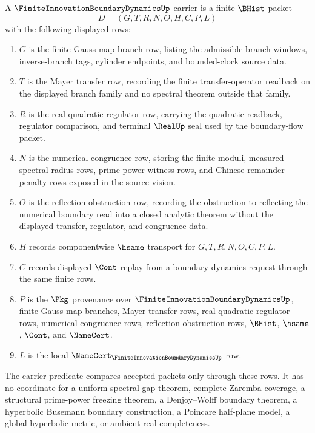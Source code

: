 \begin{definition}
\label{def:finite-innovation-boundary-dynamics-carrier}
A $\FiniteInnovationBoundaryDynamicsUp$ carrier is a finite $\BHist$ packet
$$
D=(G,T,R,N,O,H,C,P,L)
$$
with the following displayed rows:
\begin{enumerate}
\item $G$ is the finite Gauss-map branch row, listing the admissible branch windows, inverse-branch tags, cylinder endpoints, and bounded-clock source data.
\item $T$ is the Mayer transfer row, recording the finite transfer-operator readback on the displayed branch family and no spectral theorem outside that family.
\item $R$ is the real-quadratic regulator row, carrying the quadratic readback, regulator comparison, and terminal $\RealUp$ seal used by the boundary-flow packet.
\item $N$ is the numerical congruence row, storing the finite moduli, measured spectral-radius rows, prime-power witness rows, and Chinese-remainder penalty rows exposed in the source vision.
\item $O$ is the reflection-obstruction row, recording the obstruction to reflecting the numerical boundary read into a closed analytic theorem without the displayed transfer, regulator, and congruence data.
\item $H$ records componentwise $\hsame$ transport for $G,T,R,N,O,C,P,L$.
\item $C$ records displayed $\Cont$ replay from a boundary-dynamics request through the same finite rows.
\item $P$ is the $\Pkg$ provenance over $\FiniteInnovationBoundaryDynamicsUp$, finite Gauss-map branches, Mayer transfer rows, real-quadratic regulator rows, numerical congruence rows, reflection-obstruction rows, $\BHist$, $\hsame$, $\Cont$, and $\NameCert$.
\item $L$ is the local $\NameCert_{\FiniteInnovationBoundaryDynamicsUp}$ row.
\end{enumerate}
The carrier predicate compares accepted packets only through these rows. It has no coordinate for a uniform spectral-gap theorem, complete Zaremba coverage, a structural prime-power freezing theorem, a Denjoy--Wolff boundary theorem, a hyperbolic Busemann boundary construction, a Poincare half-plane model, a global hyperbolic metric, or ambient real completeness.
\end{definition}

